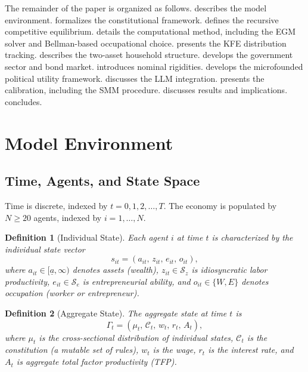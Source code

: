 \documentclass[12pt]{article}
\newtheorem{definition}{Definition}
\newcommand{\calC}{\mathcal{C}}
\newcommand{\calS}{\mathcal{S}}
\begin{document}
\medskip

The remainder of the paper is organized as follows.  describes the model environment.  formalizes the constitutional framework.  defines the recursive competitive equilibrium.  details the computational method, including the EGM solver and Bellman-based occupational choice.  presents the KFE distribution tracking.  describes the two-asset household structure.  develops the government sector and bond market.  introduces nominal rigidities.  develops the microfounded political utility framework.  discusses the LLM integration.  presents the calibration, including the SMM procedure.  discusses results and implications.  concludes.


\section{Model Environment}\label{sec:environment}

\subsection{Time, Agents, and State Space}\label{sec:state}

Time is discrete, indexed by $t = 0, 1, 2, \ldots, T$. The economy is populated by $N \geq 20$ agents, indexed by $i = 1, \ldots, N$.

\begin{definition}[Individual State]
Each agent $i$ at time $t$ is characterized by the individual state vector
\begin{equation}\label{eq:individual_state}
  s_{it} = (a_{it},\, z_{it},\, e_{it},\, o_{it}),
\end{equation}
where $a_{it} \in [\underline{a}, \infty)$ denotes assets (wealth), $z_{it} \in \calS_z$ is idiosyncratic labor productivity, $e_{it} \in \calS_e$ is entrepreneurial ability, and $o_{it} \in \{W, E\}$ denotes occupation (worker or entrepreneur).
\end{definition}

\begin{definition}[Aggregate State]
The aggregate state at time $t$ is
\begin{equation}\label{eq:aggregate_state}
  \Gamma_t = (\mu_t,\, \calC_t,\, w_t,\, r_t,\, A_t),
\end{equation}
where $\mu_t$ is the cross-sectional distribution of individual states, $\calC_t$ is the constitution (a mutable set of rules), $w_t$ is the wage, $r_t$ is the interest rate, and $A_t$ is aggregate total factor productivity (TFP).
\end{definition}
\end{document}

